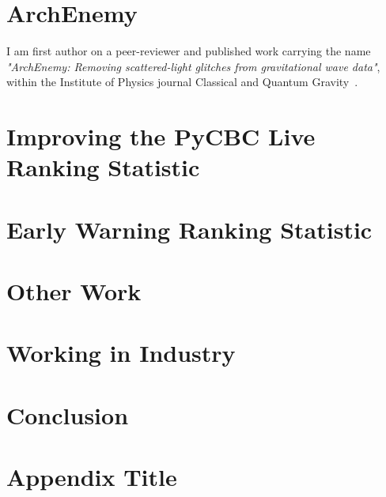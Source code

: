 \documentclass[12pt,twoside]{report} %
\begin{document}
\chapter{ArchEnemy}
I am first author on a peer-reviewer and published work carrying the name \textit{"ArchEnemy: Removing scattered-light glitches from gravitational wave data"}, within the Institute of Physics journal Classical and Quantum Gravity~\cite{ArchEnemy}.


\chapter{Improving the PyCBC Live Ranking Statistic}


\chapter{Early Warning Ranking Statistic}


\chapter{Other Work}


\chapter{Working in Industry}


\chapter{Conclusion}


\appendix
\chapter{Appendix Title}




\end{document}
